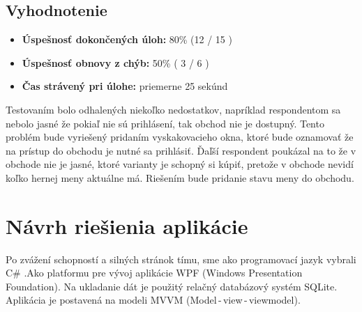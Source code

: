 \documentclass[a4paper, 11pt, onecolumn]{article}
\begin{document}
\subsection*{Vyhodnotenie}
\begin{itemize}
    \item \textbf{Úspešnosť dokončených úloh:} 80\% (12 / 15 )
    \item \textbf{Úspešnosť obnovy z chýb:} 50\% ( 3 / 6 )
    \item \textbf{Čas strávený pri úlohe:} priemerne 25 sekúnd 
\end{itemize}
Testovaním bolo odhalených niekoľko nedostatkov, napríklad respondentom sa nebolo jasné že pokiaľ nie sú prihlásení, tak 
obchod nie je dostupný. Tento problém bude vyriešený pridaním vyskakovacieho okna, ktoré bude oznamovať že na prístup do obchodu je nutné sa prihlásiť. 
Ďaľší respondent poukázal na to že v obchode nie je jasné, ktoré varianty je schopný si kúpiť, pretože v obchode nevidí koľko hernej meny aktuálne má.
Riešením bude pridanie stavu meny do obchodu.

\section{Návrh riešienia aplikácie}
Po zvážení schopností a silných stránok tímu, sme ako programovací jazyk vybrali C\# .Ako platformu pre vývoj aplikácie WPF (Windows Presentation Foundation).
Na ukladanie dát je použitý relačný databázový systém SQLite. Aplikácia je postavená na modeli MVVM (Model\,-\,view\,-\,viewmodel).
\end{document}
